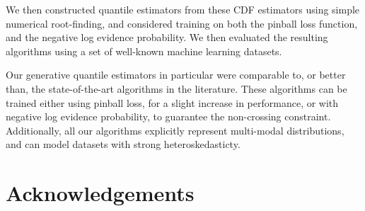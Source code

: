 \documentclass[twoside]{article} \usepackage{aistats2017}
\theoremstyle{definition}
\begin{document}
	We then constructed quantile estimators from these CDF estimators using simple numerical root-finding, and considered training on both the pinball loss function, and the negative log evidence probability. We then evaluated the resulting algorithms using a set of well-known machine learning datasets.
	
	Our generative quantile estimators in particular were comparable to, or better than, the state-of-the-art algorithms in the literature. These algorithms can be trained either using pinball loss, for a slight increase in performance, or with negative log evidence probability, to guarantee the non-crossing constraint. Additionally, all our algorithms explicitly represent multi-modal distributions, and can model datasets with strong heteroskedasticty.

\section*{Acknowledgements}



\end{document}
